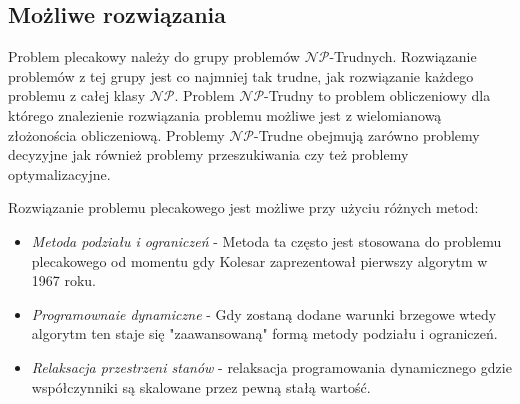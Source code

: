 \subsection{Możliwe rozwiązania}

Problem plecakowy należy do grupy problemów $\mathcal{NP}$-Trudnych. Rozwiązanie problemów z tej grupy jest co najmniej tak trudne, jak rozwiązanie każdego problemu z całej klasy $\mathcal{NP}$. Problem $\mathcal{NP}$-Trudny to problem obliczeniowy dla którego znalezienie rozwiązania problemu możliwe jest z wielomianową złożonościa obliczeniową. Problemy $\mathcal{NP}$-Trudne obejmują zarówno problemy decyzyjne jak również problemy przeszukiwania czy też problemy optymalizacyjne.

Rozwiązanie problemu plecakowego jest możliwe przy użyciu różnych metod:
\begin{itemize}
  \item \textit{Metoda podziału i ograniczeń} - Metoda ta często jest stosowana do problemu plecakowego od momentu gdy Kolesar \cite{KolesarArticle} zaprezentował pierwszy algorytm w 1967 roku.
  \item \textit{Programownaie dynamiczne} - Gdy zostaną dodane warunki brzegowe wtedy algorytm ten staje się "zaawansowaną" formą metody podziału i ograniczeń.
  \item \textit{Relaksacja przestrzeni stanów} - relaksacja programowania dynamicznego gdzie współczynniki są skalowane przez pewną stałą wartość.
\end{itemize}

